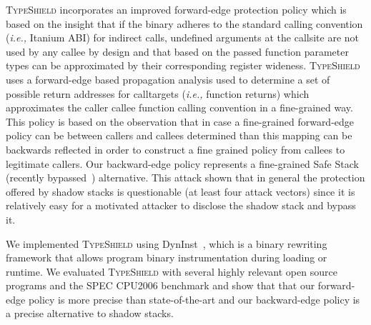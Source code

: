\textsc{TypeShield} incorporates an improved forward-edge protection policy which is
based on the insight that if the binary adheres to the standard calling convention (\textit{i.e.,} Itanium ABI)
for indirect calls, undefined arguments at the callsite are not used by any callee by design and that based
on the passed function parameter types can be approximated by their corresponding register wideness.
\textsc{TypeShield} uses a forward-edge based propagation analysis used to determine a 
set of possible return addresses for calltargets (\textit{i.e.,} function returns) which approximates the caller callee 
function calling convention in a fine-grained way. This policy is based on the observation that in case a fine-grained 
forward-edge policy can be between callers and callees determined than this mapping can be backwards reflected in order to
construct a fine grained policy from callees to legitimate callers.
Our backward-edge policy represents a fine-grained Safe Stack~\cite{volodymyr:cpi} (recently bypassed~\cite{safestack:bypassing}) alternative.
This attack shown that in general the protection offered by shadow stacks is questionable (at least four attack vectors) since it is relatively 
easy for a motivated attacker to disclose the shadow stack and bypass it.

We implemented \textsc{TypeShield} using DynInst~\cite{bernat:dyninst}, which is
a binary rewriting framework that allows program binary instrumentation during loading or runtime.
We evaluated \textsc{TypeShield} with several highly relevant open source programs and the SPEC CPU2006 benchmark
and show that that our forward-edge policy is more precise than state-of-the-art and our backward-edge policy is a precise 
alternative to shadow stacks. 

